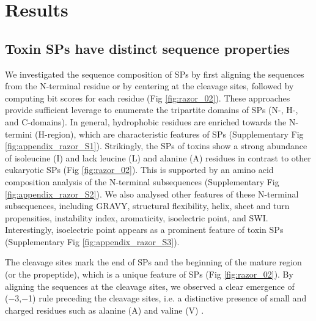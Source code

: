 \section{Results}
\subsection{Toxin SPs have distinct sequence properties}
We investigated the sequence composition of SPs by first aligning the sequences from the N-terminal residue or by centering at the cleavage sites, followed by computing bit scores for each residue (Fig  \ref{fig:razor_02}). These approaches provide sufficient leverage to enumerate the tripartite domains of SPs (N-, H-, and C-domains). In general, hydrophobic residues are enriched towards the N-termini (H-region), which are characteristic features of SPs \cite{Von_Heijne1990-sb} (Supplementary Fig \ref{fig:appendix_razor_S1}). Strikingly, the SPs of toxins show a strong abundance of isoleucine (I) and lack leucine (L) and alanine (A) residues in contrast to other eukaryotic SPs (Fig \ref{fig:razor_02}). This is supported by an amino acid composition analysis of the N-terminal subsequences (Supplementary Fig \ref{fig:appendix_razor_S2}). We also analysed other features of these N-terminal subsequences, including GRAVY, structural flexibility, helix, sheet and turn propensities, instability index, aromaticity, isoelectric point, and SWI. Interestingly, isoelectric point appears as a prominent feature of toxin SPs (Supplementary Fig \ref{fig:appendix_razor_S3}).


The cleavage sites mark the end of SPs and the beginning of the mature region (or the propeptide), which is a unique feature of SPs (Fig \ref{fig:razor_02}). By aligning the sequences at the cleavage sites, we observed a clear emergence of (−3,−1) rule preceding the cleavage sites, i.e. a distinctive presence of small and charged residues such as alanine (A) and valine (V) \cite{Von_Heijne1983-hr}.

